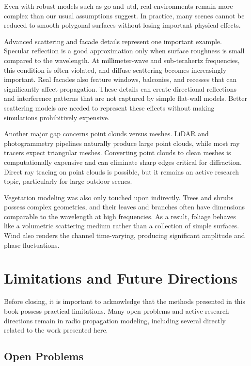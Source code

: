 Even with robust models such as \gls{go} and \gls{utd}, real environments remain more complex than our usual assumptions suggest. In practice, many scenes cannot be reduced to smooth polygonal surfaces without losing important physical effects.

Advanced scattering and facade details represent one important example. Specular reflection is a good approximation only when surface roughness is small compared to the \gls{wavelength}. At millimeter-wave and sub-terahertz frequencies, this condition is often violated, and diffuse scattering becomes increasingly important. Real facades also feature windows, balconies, and recesses that can significantly affect propagation. These details can create directional reflections and interference patterns that are not captured by simple flat-wall models. Better scattering models are needed to represent these effects without making simulations prohibitively expensive.

Another major gap concerns point clouds versus meshes. LiDAR and photogrammetry pipelines naturally produce large point clouds, while most ray tracers expect triangular meshes. Converting point clouds to clean meshes is computationally expensive and can eliminate sharp edges critical for diffraction. Direct ray tracing on point clouds is possible, but it remains an active research topic, particularly for large outdoor scenes.

Vegetation modeling was also only touched upon indirectly. Trees and shrubs possess complex geometries, and their leaves and branches often have dimensions comparable to the \gls{wavelength} at high frequencies. As a result, foliage behaves like a volumetric scattering medium rather than a collection of simple surfaces. Wind also renders the channel time-varying, producing significant amplitude and phase fluctuations.

\section{Limitations and Future Directions}

Before closing, it is important to acknowledge that the methods presented in this book possess practical limitations. Many open problems and active research directions remain in radio propagation modeling, including several directly related to the work presented here.

\subsection{Open Problems}

